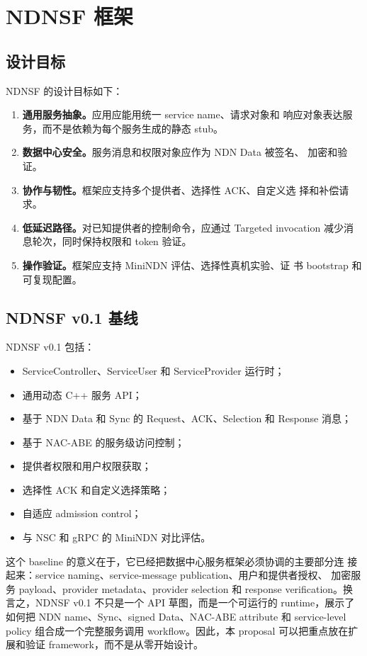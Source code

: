 \chapter{NDNSF 框架}
\label{chap:ndnsf-ch}

\section{设计目标}

NDNSF 的设计目标如下：

\begin{enumerate}[leftmargin=*]
  \item \textbf{通用服务抽象。}应用应能用统一 service name、请求对象和
  响应对象表达服务，而不是依赖为每个服务生成的静态 stub。
  \item \textbf{数据中心安全。}服务消息和权限对象应作为 NDN Data 被签名、
  加密和验证。
  \item \textbf{协作与韧性。}框架应支持多个提供者、选择性 ACK、自定义选
  择和补偿请求。
  \item \textbf{低延迟路径。}对已知提供者的控制命令，应通过 Targeted
  invocation 减少消息轮次，同时保持权限和 token 验证。
  \item \textbf{操作验证。}框架应支持 MiniNDN 评估、选择性真机实验、证
  书 bootstrap 和可复现配置。
\end{enumerate}

\section{NDNSF v0.1 基线}

NDNSF v0.1 包括：

\begin{itemize}
  \item ServiceController、ServiceUser 和 ServiceProvider 运行时；
  \item 通用动态 C++ 服务 API；
  \item 基于 NDN Data 和 Sync 的 Request、ACK、Selection 和 Response
  消息；
  \item 基于 NAC-ABE 的服务级访问控制；
  \item 提供者权限和用户权限获取；
  \item 选择性 ACK 和自定义选择策略；
  \item 自适应 admission control；
  \item 与 NSC 和 gRPC 的 MiniNDN 对比评估。
\end{itemize}

这个 baseline 的意义在于，它已经把数据中心服务框架必须协调的主要部分连
接起来：service naming、service-message publication、用户和提供者授权、
加密服务 payload、provider metadata、provider selection 和 response
verification。换言之，NDNSF v0.1 不只是一个 API 草图，而是一个可运行的
runtime，展示了如何把 NDN name、Sync、signed Data、NAC-ABE attribute 和
service-level policy 组合成一个完整服务调用 workflow。因此，本 proposal
可以把重点放在扩展和验证 framework，而不是从零开始设计。

